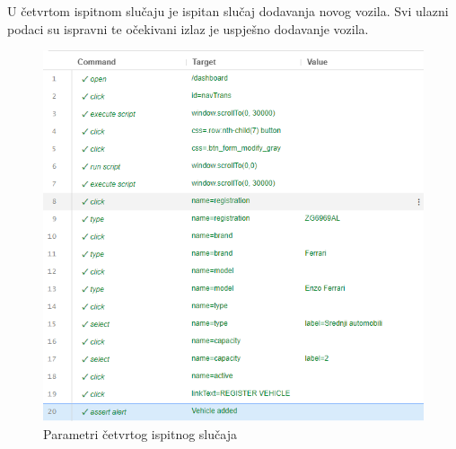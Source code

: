 			\eject
			U četvrtom ispitnom slučaju je ispitan slučaj dodavanja novog vozila. Svi ulazni podaci su ispravni te očekivani izlaz je uspješno dodavanje vozila.
			\begin{figure}[H]
				\centering
				\includegraphics[width=\textwidth]{"slike/Selenium/transport testovi/addVehicleGood_parametri.png"}
				\caption{Parametri četvrtog ispitnog slučaja}
				\label{fig: addVehicleGood_parametri}
			\end{figure}
